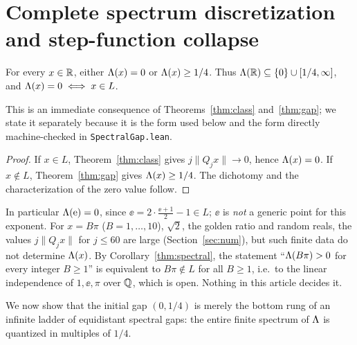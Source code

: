 \section{Complete spectrum discretization and step-function collapse}\label{sec:spectrum}

\begin{corollary}\label{thm:spectral}
For every $x\in\mathbb{R}$, either $\Lambda(x)=0$ or $\Lambda(x)\ge1/4$. Thus
$\Lambda(\mathbb{R})\subseteq\{0\}\cup[1/4,\infty]$, and $\Lambda(x)=0\iff x\in L$.
\end{corollary}

This is an immediate consequence of Theorems~\ref{thm:class}
and~\ref{thm:gap}; we state it separately because it is the form used
below and the form directly machine-checked in \texttt{SpectralGap.lean}.

\begin{proof}
If $x\in L$, Theorem~\ref{thm:class} gives $j\|Q_jx\|\to0$, hence $\Lambda(x)=0$.
If $x\notin L$, Theorem~\ref{thm:gap} gives $\Lambda(x)\ge1/4$. The dichotomy and
the characterization of the zero value follow.
\end{proof}

\begin{remark}\label{rem:linear-indep}
In particular $\Lambda(\mathrm{e})=0$, since $\ee=2\cdot\frac{\ee+1}{2}-1\in L$; $\ee$ is
\emph{not} a generic point for this exponent. For $x=B\pi$ ($B=1,\dots,10$),
$\sqrt2$, the golden ratio and random reals, the values $j\|Q_jx\|$ for
$j\le60$ are large (Section~\ref{sec:num}), but such finite data do not
determine $\Lambda(x)$. By Corollary~\ref{thm:spectral}, the statement
``$\Lambda(B\pi)>0$ for every integer $B\ge1$'' is equivalent to
$B\pi\notin L$ for all $B\ge1$, i.e.\ to the linear independence of
$1,\ee,\pi$ over $\mathbb{Q}$, which is open. Nothing in this article decides it.
\end{remark}

We now show that the initial gap $(0,1/4)$ is merely the bottom rung of an
infinite ladder of equidistant spectral gaps: the entire finite spectrum of
$\Lambda$ is quantized in multiples of $1/4$.

